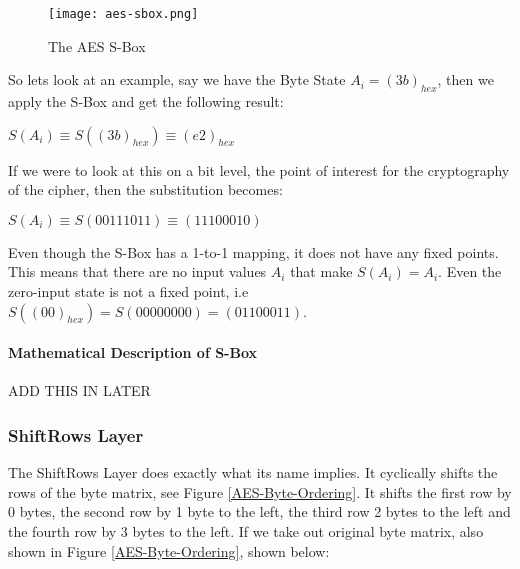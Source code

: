 \begin{figure}[H]
\begin{center}
\texttt{[image: aes-sbox.png]}
\end{center}
\caption{The AES S-Box}
\label{AES-S-BOX}
\end{figure}

So lets look at an example, say we have the Byte State $A_i = (3b)_{hex}$, then we apply the S-Box and get the following result:

\begin{center}
$S(A_i) \equiv S((3b)_{hex}) \equiv (e2)_{hex}$
\end{center}

If we were to look at this on a bit level, the point of interest for the cryptography of the cipher, then the substitution becomes:

\begin{center}
$S(A_i) \equiv S(00111011) \equiv (11100010)$
\end{center}

Even though the S-Box has a 1-to-1 mapping, it does not have any fixed points. This means that there are no input values $A_i$ that make $S(A_i) = A_i$. Even the zero-input state is not a fixed point, i.e $S((00)_{hex}) = S(00000000) = (01100011)$.

\paragraph{Mathematical Description of S-Box}

\begin{center}
ADD THIS IN LATER
\end{center}

\subsubsection{ShiftRows Layer}

The ShiftRows Layer does exactly what its name implies. It cyclically shifts the rows of the byte matrix, see Figure \ref{AES-Byte-Ordering}. It shifts the first row by 0 bytes, the second row by 1 byte to the left, the third row 2 bytes to the left and the fourth row by 3 bytes to the left. If we take out original byte matrix, also shown in Figure \ref{AES-Byte-Ordering}, shown below:

